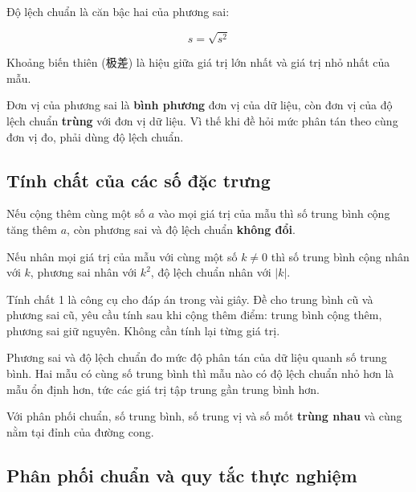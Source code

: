 \documentclass[11pt, a4paper]{article}
\begin{document}
\begin{dinhnghia}
Độ lệch chuẩn là căn bậc hai của phương sai:

$$s = \sqrt{s^2}$$
\end{dinhnghia}
\begin{dinhnghia}
Khoảng biến thiên (极差) là hiệu giữa giá trị lớn nhất và giá trị nhỏ nhất của mẫu.

 Đơn vị của phương sai là \textbf{bình phương} đơn vị của dữ liệu, còn đơn vị của độ lệch chuẩn \textbf{trùng} với đơn vị dữ liệu. Vì thế khi đề hỏi mức phân tán theo cùng đơn vị đo, phải dùng độ lệch chuẩn.
\end{dinhnghia}
\subsection{Tính chất của các số đặc trưng}

\begin{dinhly}
Nếu cộng thêm cùng một số $a$ vào mọi giá trị của mẫu thì số trung bình cộng tăng thêm $a$, còn phương sai và độ lệch chuẩn \textbf{không đổi}.
\end{dinhly}
\begin{dinhly}
Nếu nhân mọi giá trị của mẫu với cùng một số $k \neq 0$ thì số trung bình cộng nhân với $k$, phương sai nhân với $k^2$, độ lệch chuẩn nhân với $\lvert k \rvert$.

 Tính chất 1 là công cụ cho đáp án trong vài giây. Đề cho trung bình cũ và phương sai cũ, yêu cầu tính sau khi cộng thêm điểm: trung bình cộng thêm, phương sai giữ nguyên. Không cần tính lại từng giá trị.
\end{dinhly}
\begin{dinhly}
Phương sai và độ lệch chuẩn đo mức độ phân tán của dữ liệu quanh số trung bình. Hai mẫu có cùng số trung bình thì mẫu nào có độ lệch chuẩn nhỏ hơn là mẫu ổn định hơn, tức các giá trị tập trung gần trung bình hơn.
\end{dinhly}
\begin{dinhly}
Với phân phối chuẩn, số trung bình, số trung vị và số mốt \textbf{trùng nhau} và cùng nằm tại đỉnh của đường cong.
\end{dinhly}
\subsection{Phân phối chuẩn và quy tắc thực nghiệm}
\end{document}
